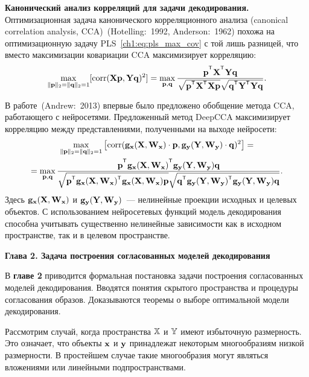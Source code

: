 \documentclass[11pt, a5paper]{dissert}
\begin{document}
\vspace{0.5cm}
\textbf{Канонический анализ корреляций для задачи декодирования.}
Оптимизационная задача канонического корреляционного анализа (canonical correlation analysis, CCA)~(Hotelling:~1992, Anderson:~1962)  похожа на оптимизационную задачу PLS~\eqref{ch1:eq:pls_max_cov} с той лишь разницей, что вместо максимизации ковариации CCA максимизирует корреляцию:
\begin{equation}
	\max_{\|\bp\|_{2}=\|\bq\|_{2}=1}[ \text{corr}(\bX \bp, \bY \bq)^{2}] = \max_{\bp, \bq} \frac{\bp^{\T} \bX^{\T} \bY \bq}{\sqrt{\bp^{\T} \bX^{\T}  \bX \bp} \sqrt{\bq^{\T} \bY^{\T}  \bY\bq}}.
	\label{ch1:eq:cca_max_corr}
\end{equation}

В работе~(Andrew:~2013) впервые было предложено обобщение метода CCA, работающего с нейросетями. 
Предложенный метод DeepCCA максимизирует корреляцию между представлениями, полученными на выходе нейросети:
\begin{multline}
	\max_{\|\bp\|_{2}=\|\bq\|_{2}=1}\left[ \text{corr}(\mathbf{g}_{\bx}(\bX, \bW_{\bx}) \cdot \bp, \mathbf{g}_{\by}(\bY, \bW_{\by}) \cdot \bq)^{2}\right] = \\ = \max_{\bp, \bq} \frac{\bp^{\T} \mathbf{g}_{\bx}(\bX, \bW_{\bx})^{\T} \mathbf{g}_{\by}(\bY, \bW_{\by}) \bq}{\sqrt{\bp^{\T} \mathbf{g}_{\bx}(\bX, \bW_{\bx})^{\T}  \mathbf{g}_{\bx}(\bX, \bW_{\bx}) \bp} \sqrt{\bq^{\T} \mathbf{g}_{\by}(\bY, \bW_{\by})^{\T}  \mathbf{g}_{\by}(\bY, \bW_{\by}) \bq}}.
	\label{ch1:eq:depp_cca_max_corr}
\end{multline}
Здесь $\mathbf{g}_{\mathbf{x}}(\mathbf{X}, \mathbf{W}_{\mathbf{x}})$ и $\mathbf{g}_{\mathbf{y}}(\mathbf{Y}, \mathbf{W}_{\mathbf{y}})$~--- нелинейные проекции исходных и целевых объектов.
С использованием нейросетевых функций модель декодирования способна учитывать существенно нелинейные зависимости как в исходном пространстве, так и в целевом пространстве.

\textbf{Глава 2. Задача построения согласованных моделей декодирования}

В \textbf{главе 2} приводится формальная постановка задачи построения согласованных моделей декодирования. 
Вводятся понятия скрытого пространства и процедуры согласования образов.
Доказываются теоремы о выборе оптимальной модели декодирования.

\begin{assumption}
	Рассмотрим случай, когда пространства $\mathbb{X}$ и $\mathbb{Y}$ имеют избыточную размерность. 
	Это означает, что объекты $\mathbf{x}$ и $\mathbf{y}$ принадлежат некоторым многообразиям низкой размерности. В простейшем случае такие многообразия могут являться вложениями или линейными подпространствами.
\end{assumption}
\end{document}
